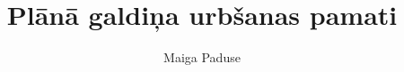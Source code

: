 \title{Plānā galdiņa urbšanas pamati}
\author{Maiga Paduse}
\def \advisor{
	  Zinātniskais vadītājs\\
      Datorzinātņu doktors\\
      \large{\MakeUppercase{Stīvs Gulbis}}
}
\def \student_number{111REB007}
\def \programm_description{Darbmācības maģistra programmas students}
\def \university{Rīgas Tehniskā universitāte}
\def \faculty{Neeksistējoša un Fiktīva fakultāte}
\def \city{Rīga}
\def \year{1984}